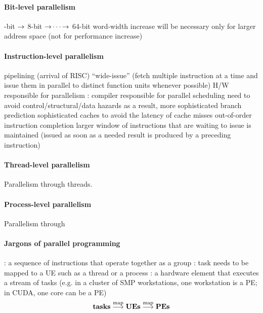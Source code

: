 \documentclass{myproc}
\begin{document}
\small
{}

\paragraph{Bit-level parallelism\/}
    \bit
    -bit $\mbox{$\rightarrow$}$ 8-bit $\mbox{$\rightarrow$} \cdots \mbox{$\rightarrow$} $ 64-bit 
    \w word-width increase will be necessary only for larger address space
      (not for performance increase)
    \eit
\paragraph{Instruction-level parallelism}
    \bit
    \w pipelining (arrival of RISC)
    \w ``wide-issue'' 
    (fetch multiple instruction at a time and issue
    them in parallel to distinct function units whenever possible)
      \bit
      \w H/W responsible for parallelism
      \eit
    \w {}: compiler responsible for parallel scheduling
      \bit
      \w need to avoid control/structural/data hazards 
      \w as a result, more sophisticated branch prediction 
      \w sophisticated caches to avoid the latency of cache misses
      \w out-of-order instruction completion
      \w larger window of instructions that are waiting to issue is maintained 
         (issued as soon as a needed result is produced by a preceding
      instruction) 
      \w {}
      \eit
    \eit
\paragraph{Thread-level parallelism}
\bit
\w Parallelism through threads.
\eit

\paragraph{Process-level parallelism}
\bit
\w Parallelism through 
\eit

\paragraph{Jargons of parallel programming}
\bit
\w {}: a sequence of instructions that operate together as a group
\w {}: task needs to be mapped to a UE such as a
thread or a process
\w {}: a hardware element that executes a stream of
tasks (e.g. in a cluster of SMP workstations, one workstation is a PE; in
CUDA, one core can be a PE)
 \[ \mbox{{\bf{tasks}}} \stackrel{\mbox{\scriptsize{}map}}{\longrightarrow} \mbox{{\bf{UEs}}}\stackrel{\mbox{\scriptsize{}map}}{\longrightarrow} \mbox{{\bf{PEs}}} \]
\end{document}
